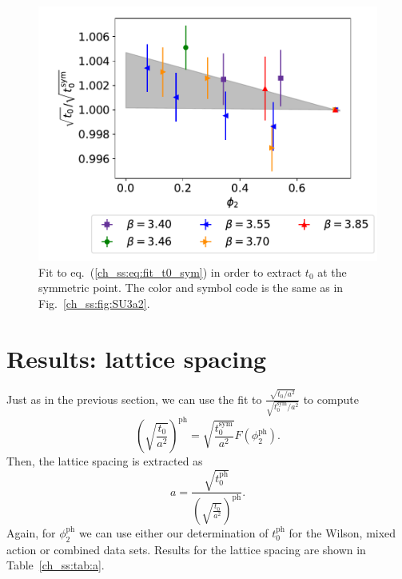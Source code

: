 \begin{figure}
    \centering
    \includegraphics[width=1.\textwidth]{./cap5/figs/t0_sym.pdf}
    \caption{Fit to eq.~(\ref{ch_ss:eq:fit_t0_sym}) in order to extract $t_0$ at the symmetric point. The color and symbol code is the same as in Fig.~\ref{ch_ss:fig:SU3a2}.}
    \label{ch_ss:fig:t0_sym}
\end{figure}

\section{Results: lattice spacing}
\label{ch_ss:sec:t0_sym}

Just as in the previous section, we can use the fit to $\frac{\sqrt{t_0/a^2}}{\sqrt{t_0^{\textrm{sym}}/a^2}}$ to compute 
\begin{equation}
\left(\sqrt{\frac{t_0}{a^2}}\right)^{\textrm{ph}}=\sqrt{\frac{t_0^{\textrm{sym}}}{a^2}}F(\phi_2^{\textrm{ph}}).
\end{equation}
Then, the lattice spacing is extracted as
\begin{equation}
\label{ch_ss:eq:a}
a=\frac{\sqrt{t_0^{\textrm{ph}}}}{\left(\sqrt{\frac{t_0}{a^2}}\right)^{\textrm{ph}}}.
\end{equation}
Again, for $\phi_2^{\textrm{ph}}$ we can use either our determination of $t_0^{\textrm{ph}}$ for the Wilson, mixed action or combined data sets. Results for the lattice spacing are shown in Table~\ref{ch_ss:tab:a}.

